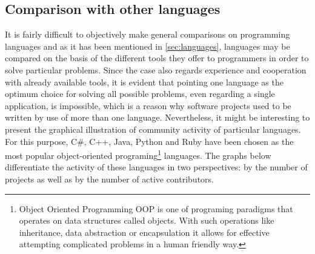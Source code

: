 \subsection{Comparison with other languages}\label{subsec:lang_compare}
It is fairly difficult to objectively make general comparisons on programming languages and as it has been mentioned in \ref{sec:languages}, languages may be compared on the basis of the different tools they offer to programmers in order to solve particular problems. Since the case also regards experience and cooperation with already available tools, it is evident that pointing one language as the optimum choice for solving all possible problems, even regarding a single application, is impossible, which is a reason why software projects used to be written by use of more than one language. Nevertheless, it might be interesting to present the graphical illustration of community activity of particular languages. For this purpose, C\#, C++, Java, Python and Ruby have been chosen as the most popular object-oriented programing\footnote{Object Oriented Programming OOP is one of programing paradigms that operates on data structures called objects. With such operations like inheritance, data abstraction or encapsulation it allows for effective attempting complicated problems in a human friendly way.} languages. The graphs below differentiate the activity of these languages in two perspectives: by the number of projects as well as by the number of active contributors.
